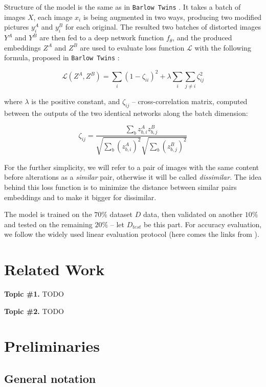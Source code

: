\documentclass{article}
\begin{document}
Structure of the model is the same as in \texttt{Barlow Twins} \cite{zbontar2021barlow}.
It takes a batch of images $X$, each image $x_i$ is being augmented in two ways, producing 
two modified pictures $y_i^A$ and $y_i^B$ for each original. 
The resulted two batches of distorted images $Y^A$ and $Y^B$ are then
fed to a deep network function $f_{\theta}$, and the produced embeddings $Z^A$ and $Z^B$ 
are used to evaluate loss function $\mathcal{L}$ with the following formula, proposed in 
\texttt{Barlow Twins} \cite{zbontar2021barlow}:

$$ \mathcal{L}(Z^A, Z^B) = \sum_i {(1 - \zeta_{ii})^2} + \lambda \sum_{i}\sum_{j \neq i}{\zeta_{ij}^2} $$

where $\lambda$ is the positive constant, and $\zeta_{ij}$ -- cross-correlation matrix, 
computed between the outputs of the two identical networks along the batch dimension:

$$ \zeta_{ij} = 
\frac{\sum_b{z_{b,i}^A z_{b,j}^B}}{\sqrt{\sum_b{(z_{b,i}^A)^2}}\sqrt{\sum_b{(z_{b,j}^B)^2}}} $$

For the further simplicity, we will refer to a pair of images with the same content 
before alterations as a \textit{similar} pair, otherwise it will be called \textit{dissimilar}. 
The idea behind this loss function is to minimize the distance between similar pairs embeddings 
and to make it bigger for dissimilar.

The model is trained on the $70\%$ dataset $D$ data, then validated on another $10\%$ 
and tested on the remaining $20\%$ -- let $D_{test}$ be this part. For accuracy evaluation, 
we follow the widely used linear evaluation protocol (here comes the links from \cite{chen2020simclr}).

\section{Related Work}\label{sec:rw}

\textbf{Topic \#1.}
TODO

\textbf{Topic \#2.}
TODO

\section{Preliminaries}\label{sec:prelim}

\subsection{General notation}
\end{document}
